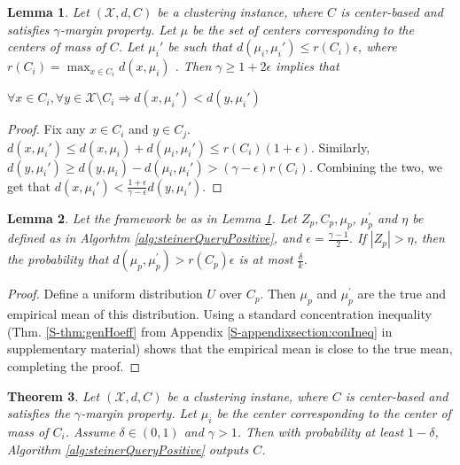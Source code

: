 \documentclass{article}
\newcommand{\mc}{\mathcal}
\newtheorem{theorem}{Theorem}
\newtheorem{lemma}[theorem]{Lemma}
\begin{document}
\begin{lemma}
\label{lemma:hasGammaMargin}
Let $(\mc X, d, C)$ be a clustering instance, where $C$ is center-based and satisfies $\gamma$-margin property. Let $\mu$ be the set of centers corresponding to the centers of mass of $C$. Let $\mu_i'$ be such that $d(\mu_i, \mu_i') \le r(C_i)\epsilon$, where $r(C_i) = \max_{x\in C_i}d(x, \mu_i)$ . Then $\gamma \ge 1 + 2\epsilon$ implies that 

\begin{center}$\forall x \in C_i, \forall y \in {\mc X} \setminus C_i \Rightarrow d(x, \mu_i') < d(y, \mu_i')$\end{center}
\end{lemma}

\begin{proof}
Fix any $x \in C_i$ and $y \in C_j$. $d(x, \mu_i') \le d(x, \mu_i)+d(\mu_i, \mu_i') \le r(C_i) (1+\epsilon)$. Similarly, $d(y, \mu_i') \ge d(y, \mu_i) - d(\mu_i, \mu_i') > (\gamma -\epsilon)r(C_i)$. Combining the two, we get that $d(x, \mu_i') < \frac{1+\epsilon}{\gamma-\epsilon}d(y, \mu_i')$. 
\end{proof}

\begin{lemma}
\label{lemma:phase1}
Let the framework be as in Lemma \ref{lemma:hasGammaMargin}. Let $Z_p, C_p, \mu_p$, $\mu_p^\prime$ and $\eta$ be defined as in Algorhtm \ref{alg:steinerQueryPositive}, and $\epsilon = \frac{\gamma - 1}{2}$. If $|Z_p| > \eta$, then the probability that $d(\mu_p, \mu_p^\prime) > r(C_p)\epsilon$ is at most $\frac{\delta}{k}$.
\end{lemma}
\begin{proof}
Define a uniform distribution $U$ over $C_p$. Then $\mu_p$ and $\mu_p^\prime$ are the true and empirical mean of this distribution. Using a standard concentration inequality (Thm. \ref{S-thm:genHoeff} from Appendix \ref{S-appendixsection:conIneq} in supplementary material) shows that the empirical mean is close to the true mean, completing the proof.

\end{proof}

\begin{theorem}
\label{thm:steinerQueryPositive}
Let $(\mc X, d, C)$ be a clustering instane, where $C$ is center-based and satisfies the $\gamma$-margin property. Let $\mu_i$ be the center corresponding to the center of mass of $C_i$.
Assume $\delta \in (0, 1)$ and $\gamma > 1$. Then with probability at least $1-\delta$, Algorithm \ref{alg:steinerQueryPositive} outputs $C$.
\end{theorem}
\end{document}
